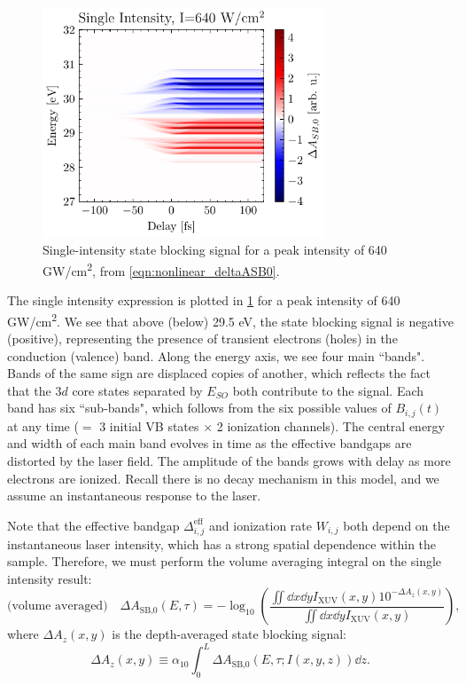 \begin{figure}
	\centering
	\includegraphics[width=0.75\textwidth]{figures/chap4/dASB0_1430nm_640GWcm2.pdf}
	\caption{Single-intensity state blocking signal for a peak intensity of 640 GW/cm\textsuperscript{2}, from \cref{eqn:nonlinear_deltaASB0}.}
	\label{fig:dASB0_1430nm_640GWcm2}
\end{figure}

The single intensity expression is plotted in \cref{fig:dASB0_1430nm_640GWcm2} for a peak intensity of 640 GW/cm\textsuperscript{2}. We see that above (below) 29.5 eV, the state blocking signal is negative (positive), representing the presence of transient electrons (holes) in the conduction (valence) band. Along the energy axis, we see four main ``bands". Bands of the same sign are displaced copies of another, which reflects the fact that the $3d$ core states separated by $E_{SO}$ both contribute to the signal. Each band has six ``sub-bands", which follows from the six possible values of $B_{i,j}(t)$ at any time ($=$ 3 initial VB states $\times$ 2 ionization channels). The central energy and width of each main band evolves in time as the effective bandgaps are distorted by the laser field. The amplitude of the bands grows with delay as more electrons are ionized. Recall there is no decay mechanism in this model, and we assume an instantaneous response to the laser.

Note that the effective bandgap $\Delta_{i,j}^{\textrm{eff}}$ and ionization rate $W_{i,j}$ both depend on the instantaneous laser intensity, which has a strong spatial dependence within the sample. Therefore, we must perform the volume averaging integral on the single intensity result:
\begin{equation}
\label{eqn:Delta_A_5}
\textrm{(volume averaged)} \quad \Delta A_{\textrm{SB,0}}(E,\tau) = -\log_{10} \left( \frac{ \iint \dd{x} \dd{y} I_{\textrm{XUV}}(x,y) 10^{-\Delta A_z(x,y)}}{ \iint \dd{x} \dd{y} I_{\textrm{XUV}}(x,y)} \right),
\end{equation}
where $\Delta A_z(x,y)$ is the depth-averaged state blocking signal:
\begin{equation}
\Delta A_z(x,y) \equiv  \alpha_{10} \int_{0}^{L} \Delta A_{\textrm{SB,0}}(E,\tau; I(x,y,z)) \dd{z}.
\end{equation}


